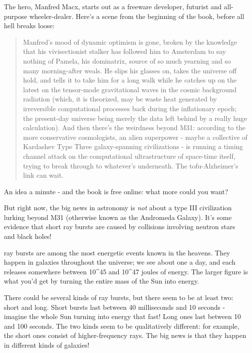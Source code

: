 The hero, Manfred Macx, starts out as a freeware developer, futurist 
and all-purpose wheeler-dealer.  Here's a scene from the beginning
of the book, before all hell breaks loose:

\begin{quote}
     Manfred's mood of dynamic optimism is gone, broken by the 
     knowledge that his vivisectionist stalker has followed him 
     to Amsterdam  to say nothing of Pamela, his dominatrix, 
     source of so much yearning and so many morning-after weals. 
     He slips his glasses on, takes the universe off hold, and 
     tells it to take him for a long walk while he catches up on 
     the latest on the tensor-mode gravitational waves in the 
     cosmic background radiation (which, it is theorized, may be 
     waste heat generated by irreversible computational processes 
     back during the inflationary epoch; the present-day universe 
     being merely the data left behind by a really huge calculation). 
     And then there's the weirdness beyond M31: according to the 
     more conservative cosmologists, an alien superpower - maybe 
     a collective of Kardashev Type Three galaxy-spanning 
     civilizations - is running a timing channel attack on the 
     computational ultrastructure of space-time itself, trying to 
     break through to whatever's underneath.  The tofu-Alzheimer's 
     link can wait.
\end{quote}

An idea a minute - and the book is free online: what more could you 
want?  

But right now, the big news in astronomy is \emph{not} about a type III 
civilization lurking beyond M31 (otherwise known as the Andromeda
Galaxy).  It's some evidence that short \gamma  ray bursts are caused 
by collisions involving neutron stars and black holes!

\Gamma  ray bursts are among the most energetic events known in the
heavens.   They happen in galaxies throughout the universe; we see 
about one a day, and each releases somewhere between 10^{45} and 
10^{47} joules of energy.  The larger figure is what you'd get by 
turning the entire mass of the Sun into energy.  

There could be several kinds of \gamma  ray bursts, but there seem to
be at least two: short and long.   Short bursts last between 
40 milliseconds and 10 seconds - imagine the whole Sun turning into 
energy that fast!  Long ones last between 10 and 100 seconds.  The
two kinds seem to be qualitatively different: for example, the short 
ones consist of higher-frequency \gamma  rays.  The big news is that 
they happen in different kinds of galaxies!

